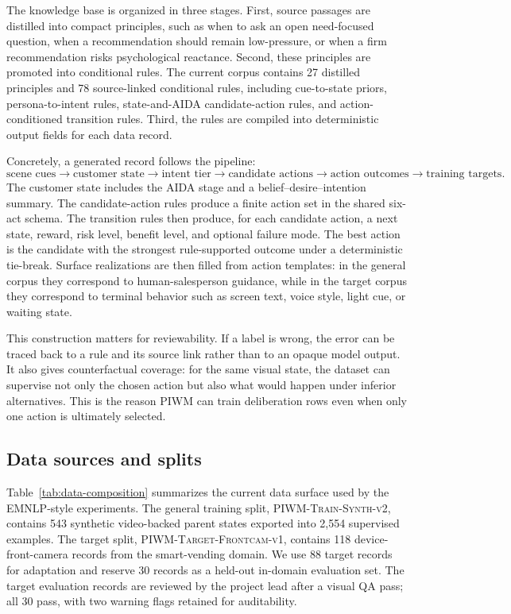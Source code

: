 The knowledge base is organized in three stages. First, source passages are distilled into compact principles, such as when to ask an open need-focused question, when a recommendation should remain low-pressure, or when a firm recommendation risks psychological reactance. Second, these principles are promoted into conditional rules. The current corpus contains 27 distilled principles and 78 source-linked conditional rules, including cue-to-state priors, persona-to-intent rules, state-and-AIDA candidate-action rules, and action-conditioned transition rules. Third, the rules are compiled into deterministic output fields for each data record.

Concretely, a generated record follows the pipeline:
\[
\text{scene cues} \rightarrow
\text{customer state} \rightarrow
\text{intent tier} \rightarrow
\text{candidate actions} \rightarrow
\text{action outcomes} \rightarrow
\text{training targets}.
\]
The customer state includes the AIDA stage and a belief--desire--intention summary. The candidate-action rules produce a finite action set in the shared six-act schema. The transition rules then produce, for each candidate action, a next state, reward, risk level, benefit level, and optional failure mode. The best action is the candidate with the strongest rule-supported outcome under a deterministic tie-break. Surface realizations are then filled from action templates: in the general corpus they correspond to human-salesperson guidance, while in the target corpus they correspond to terminal behavior such as screen text, voice style, light cue, or waiting state.

This construction matters for reviewability. If a label is wrong, the error can be traced back to a rule and its source link rather than to an opaque model output. It also gives counterfactual coverage: for the same visual state, the dataset can supervise not only the chosen action but also what would happen under inferior alternatives. This is the reason PIWM can train deliberation rows even when only one action is ultimately selected.

\subsection{Data sources and splits}

Table~\ref{tab:data-composition} summarizes the current data surface used by the EMNLP-style experiments. The general training split, \textsc{PIWM-Train-Synth-v2}, contains 543 synthetic video-backed parent states exported into 2,554 supervised examples. The target split, \textsc{PIWM-Target-Frontcam-v1}, contains 118 device-front-camera records from the smart-vending domain. We use 88 target records for adaptation and reserve 30 records as a held-out in-domain evaluation set. The target evaluation records are reviewed by the project lead after a visual QA pass; all 30 pass, with two warning flags retained for auditability.

